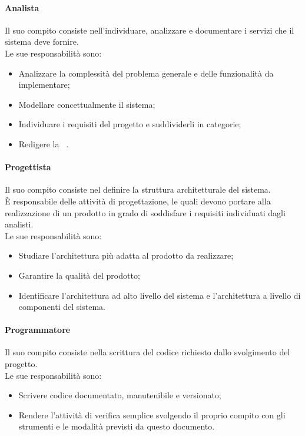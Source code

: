      \paragraph{Analista}
        Il suo compito consiste nell'individuare, analizzare e documentare i servizi che il sistema deve fornire.\\
        Le sue responsabilità sono:
        \begin{itemize}
          \item Analizzare la complessità del problema generale e delle funzionalità da implementare;
          \item Modellare concettualmente il sistema;
          \item Individuare i requisiti del progetto e suddividerli in categorie;
          \item Redigere la \docNameVersionAdR\ .
        \end{itemize}
      
      \paragraph{Progettista}
        Il suo compito consiste nel definire la struttura architetturale del sistema.\\
        È responsabile delle attività di progettazione, le quali devono portare alla realizzazione di un prodotto in grado di soddisfare i requisiti individuati dagli analisti.\\
        Le sue responsabilità sono:
        \begin{itemize}
          \item Studiare l'architettura più adatta al prodotto da realizzare;
          \item Garantire la qualità del prodotto;
          \item Identificare l'architettura ad alto livello del sistema e l'architettura a livello di componenti del sistema.
        \end{itemize}

      \paragraph{Programmatore}
        Il suo compito consiste nella scrittura del codice richiesto dallo svolgimento del progetto.\\
        Le sue responsabilità sono:
        \begin{itemize}
          \item Scrivere codice documentato, manutenibile e versionato;
          \item Rendere l'attività di verifica semplice svolgendo il proprio compito con gli strumenti e le modalità previsti da questo documento.
        \end{itemize}

